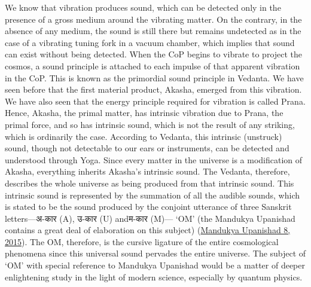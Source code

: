 \documentclass[twoside, 13pt]{article}
\begin{document}
{{\fontsize{12}{14}\selectfont We know that vibration produces sound, which can be detected only in the presence of a gross medium around the vibrating matter. On the contrary, in the absence of any medium, the sound is still there but remains undetected as in the case of a vibrating tuning fork in a vacuum chamber, which implies that sound can exist without being detected. When the CoP begins to vibrate to project the cosmos, a sound principle is attached to each impulse of that apparent vibration in the CoP. This is known as the primordial sound principle in Vedanta. We have seen before that the first material product, Akasha, emerged from this vibration. We have also seen that the energy principle required for vibration is called Prana. Hence, Akasha, the primal matter, has intrinsic vibration due to Prana, the primal force, and so has intrinsic sound, which is not the result of any striking, which is ordinarily the case. According to Vedanta, this intrinsic (unstruck) sound, though not detectable to our ears or instruments, can be detected and understood through Yoga. Since every matter in the universe is a modification of Akasha, everything inherits Akasha’s intrinsic sound. The Vedanta, therefore, describes the whole universe as being produced from that intrinsic sound. This intrinsic sound is represented by the summation of all the audible sounds, which is stated to be the sound produced by the conjoint utterance of three Sanskrit letters—\foreignlanguage{hindi}{{\fontsize{9}{11}\selectfont अ-कार }}(A), \foreignlanguage{hindi}{{\fontsize{9}{11}\selectfont उ-कार }}(U) and\break \foreignlanguage{hindi}{{\fontsize{9}{11}\selectfont म-कार}} (M)— ‘OM’ (the Mandukya Upanishad contains a great deal of elaboration on this subject) (\underline{Mandukya Upanishad 8, 2015}). The OM, therefore, is the cursive ligature of the entire cosmological phenomena since this universal sound pervades the entire universe. The subject of ‘OM’ with special reference to Mandukya Upanishad would be a matter of deeper enlightening study in the light of modern science, especially by quantum physics. }

}
\end{document}
